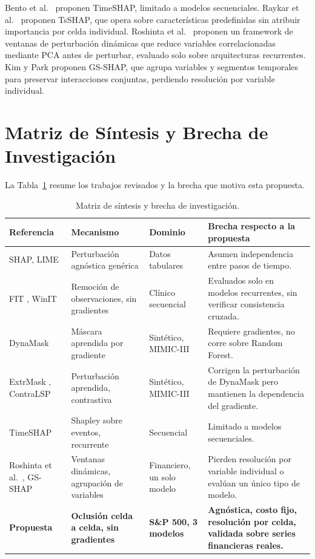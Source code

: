Bento et al.\ \cite{bento2021} proponen TimeSHAP, limitado a modelos secuenciales. Raykar et al.\ \cite{raykar2023} proponen TsSHAP, que opera sobre características predefinidas sin atribuir importancia por celda individual. Roshinta et al.\ \cite{roshinta2026} proponen un framework de ventanas de perturbación dinámicas que reduce variables correlacionadas mediante PCA antes de perturbar, evaluado solo sobre arquitecturas recurrentes. Kim y Park \cite{gsshap2026} proponen GS-SHAP, que agrupa variables y segmentos temporales para preservar interacciones conjuntas, perdiendo resolución por variable individual.

\section{Matriz de Síntesis y Brecha de Investigación}

La Tabla~\ref{tab:gaps} resume los trabajos revisados y la brecha que motiva esta propuesta.

\begin{table}[h!]
\centering
\footnotesize
\setlength{\tabcolsep}{3pt}
\renewcommand{\arraystretch}{1.3}
\begin{tabular}{|>{\raggedright\arraybackslash}p{2.8cm}|>{\raggedright\arraybackslash}p{2.4cm}|>{\raggedright\arraybackslash}p{2.0cm}|>{\raggedright\arraybackslash}p{4.2cm}|}
\hline
\textbf{Referencia} & \textbf{Mecanismo} & \textbf{Dominio} & \textbf{Brecha respecto a la propuesta} \\ \hline
SHAP, LIME \cite{arsenault2025} & Perturbación agnóstica genérica & Datos tabulares & Asumen independencia entre pasos de tiempo. \\ \hline
FIT \cite{tonekaboni2020}, WinIT \cite{leung2023winit} & Remoción de observaciones, sin gradientes & Clínico secuencial & Evaluados solo en modelos recurrentes, sin verificar consistencia cruzada. \\ \hline
DynaMask \cite{crabbe2021} & Máscara aprendida por gradiente & Sintético, MIMIC-III & Requiere gradientes, no corre sobre Random Forest. \\ \hline
ExtrMask \cite{enguehard2023}, ContraLSP \cite{liu2024contralsp} & Perturbación aprendida, contrastiva & Sintético, MIMIC-III & Corrigen la perturbación de DynaMask pero mantienen la dependencia del gradiente. \\ \hline
TimeSHAP \cite{bento2021} & Shapley sobre eventos, recurrente & Secuencial & Limitado a modelos secuenciales. \\ \hline
Roshinta et al.\ \cite{roshinta2026}, GS-SHAP \cite{gsshap2026} & Ventanas dinámicas, agrupación de variables & Financiero, un solo modelo & Pierden resolución por variable individual o evalúan un único tipo de modelo. \\ \hline
\textbf{Propuesta} & \textbf{Oclusión celda a celda, sin gradientes} & \textbf{S\&P 500, 3 modelos} & \textbf{Agnóstica, costo fijo, resolución por celda, validada sobre series financieras reales.} \\ \hline
\end{tabular}
\caption{Matriz de síntesis y brecha de investigación.}
\label{tab:gaps}
\end{table}


